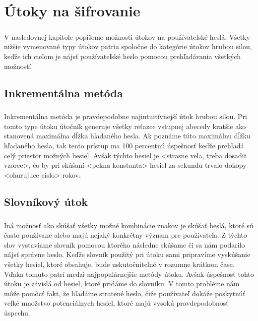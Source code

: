\chapter{Útoky na šifrovanie}
\paragraph{}
V nasledovnej kapitole popíšeme možnosti útokov na používateľské heslá. Všetky nižšie vymenované typy útokov patria spoločne do kategórie útokov hrubou silou, keďže ich cieľom je nájsť používateľské heslo pomocou prehľadávania všetkých možností. 
\section{Inkrementálna metóda}
\paragraph{}
Inkrementálna metóda je pravdepodobne najintuitívnejší útok hrubou silou. Pri tomto type útoku útočník generuje všetky reťazce vstupnej abecedy kratšie ako stanovená maximálna dĺžka hľadaného hesla. Ak poznáme túto maximálnu dĺžku hľadaného hesla, tak tento prístup ma 100 percentnú úspešnosť keďže prehľadá celý priestor možných hesiel. Avšak týchto hesiel je <strasne vela, treba dosadit vzorec>, čo by pri skúšaní <pekna konstanta> hesiel za sekundu trvalo dokopy <ohurujuce cislo> rokov.

\section{Slovníkový útok}
\paragraph{}
Iná možnosť ako skúšať všetky možné kombinácie znakov je skúšať heslá, ktoré sú často používane alebo majú nejaký konkrétny význam pre používateľa. Z týchto slov vystaviame slovník pomocou ktorého následne skúšame či sa nám podarilo nájsť správne heslo. Keďže slovník použitý pri útoku sami pripravíme vyskúšanie všetky hesiel, ktoré obsahuje, bude uskutočniteľné v rozumne krátkom čase. Vďaka tomuto patrí medzi najpopulárnejšie metódy útoku. Avšak úspešnosť tohto útoku je závislá od hesiel, ktoré pridáme do slovníku. V tomto probléme nám môže pomôcť fakt, že hľadáme stratené heslo, čiže používateľ dokáže poskytnúť veľké množstvo potenciálnych hesiel, ktoré majú vysokú pravdepodobnosť úspechu. 

